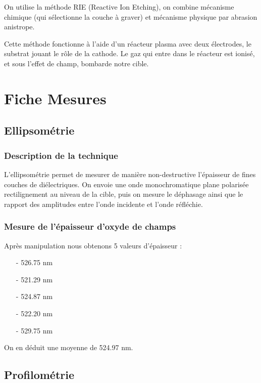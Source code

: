 \documentclass[11pt]{article}
\begin{document}
On utilise la m\'ethode RIE (Reactive Ion Etching), on combine m\'ecanisme chimique (qui s\'electionne la couche \`a graver) et m\'ecanisme physique par abrasion anistrope.

Cette m\'ethode fonctionne \`a l'aide d'un r\'eacteur plasma avec deux \'electrodes, le substrat jouant le rôle de la cathode. Le gaz qui entre dans le r\'eacteur est ionis\'e, et sous l'effet de champ, bombarde notre cible.


\clearpage

\section{Fiche Mesures}

\subsection{Ellipsom\'etrie}

\subsubsection{Description de la technique }

L'ellipsom\'etrie permet de mesurer de mani\`ere non-destructive l'\'epaisseur de fines couches de di\'electriques. On envoie une onde monochromatique plane polaris\'ee rectilignement au niveau de la cible, puis on mesure le d\'ephasage ainsi que le rapport des amplitudes entre l'onde incidente et l'onde r\'efl\'echie. 

\subsubsection{Mesure de l'\'epaisseur d'oxyde de champs}

Apr\`es manipulation nous obtenons 5 valeurs d'\'epaisseur :
\begin{itemize} \itemsep -6pt
\item[-] 526.75 nm
\item[-] 521.29 nm
\item[-] 524.87 nm
\item[-] 522.20 nm 
\item[-] 529.75 nm
\end{itemize}
On en d\'eduit une moyenne de 524.97 nm.

\subsection{Profilom\'etrie}
\end{document}
